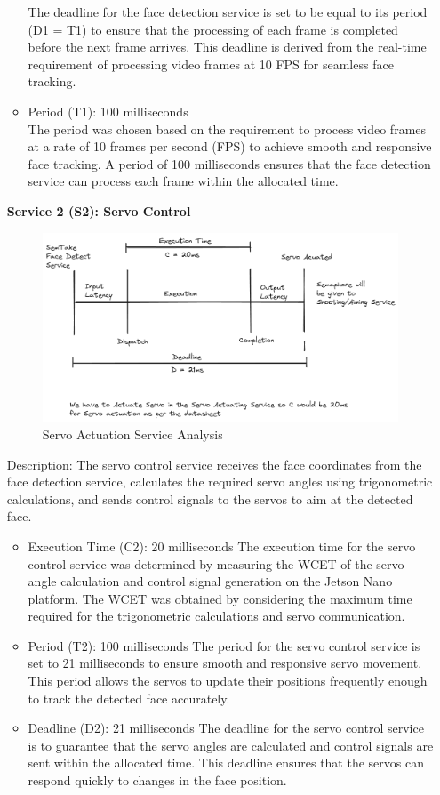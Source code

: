\documentclass[a4paper,11pt]{article}%
\newenvironment{qanda}{\setlength{\parindent}{0pt}}{\bigskip}
\begin{document}
\begin{qanda}
\begin{enumerate}
\begin{itemize}
					The deadline for the face detection service is set to be equal to its period (D1 = T1) to ensure that the processing of each frame is completed before the next frame arrives. This deadline is derived from the real-time requirement of processing video frames at 10 FPS for seamless face tracking.
				\item[] Period (T1): 100 milliseconds\\
					The period was chosen based on the requirement to process video frames at a rate of 10 frames per second (FPS) to achieve smooth and responsive face tracking. A period of 100 milliseconds ensures that the face detection service can process each frame within the allocated time.
			\end{itemize}


			\textbf{Service 2 (S2): Servo Control}\\
			\begin{figure}[H]
				\centering
				\includegraphics[scale=0.4]{figures/servo_actuation_service.png}
				\caption{Servo Actuation Service Analysis}
			\end{figure}
			Description: The servo control service receives the face coordinates from the face detection service, calculates the required servo angles using trigonometric calculations, and sends control signals to the servos to aim at the detected face.
			\begin{itemize}
				\item[] Execution Time (C2): 20 milliseconds
					The execution time for the servo control service was determined by measuring the WCET of the servo angle calculation and control signal generation on the Jetson Nano platform. The WCET was obtained by considering the maximum time required for the trigonometric calculations and servo communication.
				\item[] Period (T2): 100 milliseconds
					The period for the servo control service is set to 21 milliseconds to ensure smooth and responsive servo movement. This period allows the servos to update their positions frequently enough to track the detected face accurately.
				\item[] Deadline (D2): 21 milliseconds
					The deadline for the servo control service is to guarantee that the servo angles are calculated and control signals are sent within the allocated time. This deadline ensures that the servos can respond quickly to changes in the face position.
			\end{itemize}



\end{enumerate}
\end{qanda}
\end{document}

